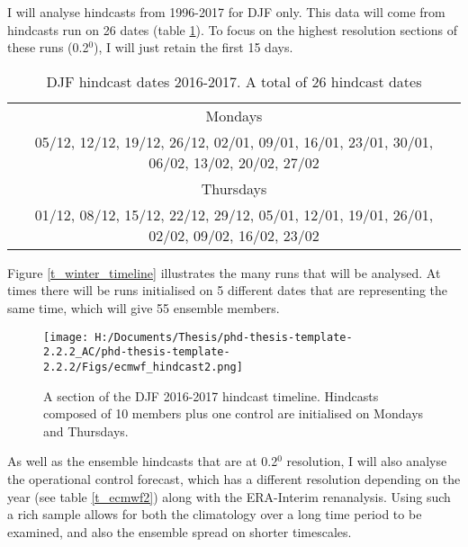 
I will analyse hindcasts from 1996-2017 for DJF only. This data will come from hindcasts run on 26 dates (table \ref{t_winterdates}). To focus on the highest resolution sections of these runs (0.2$^0$), I will just retain the first 15 days.

\begin{table}[h]
	\caption{DJF hindcast dates 2016-2017. A total of 26 hindcast dates}\label{t_winterdates}
	\begin{center}
		\begin{tabular}{c}
			\hline\hline
			Mondays \\
			05/12, 12/12, 19/12, 26/12, 02/01, 09/01, 16/01, 23/01, 30/01, 06/02, 13/02, 20/02, 27/02 \\ 
			\hline
			Thursdays \\			
			01/12, 08/12, 15/12, 22/12, 29/12, 05/01, 12/01, 19/01, 26/01, 02/02, 09/02, 16/02, 23/02  \\ 			
			\hline
		\end{tabular}
	\end{center}
\end{table}

Figure \ref{t_winter_timeline} illustrates the many runs that will be analysed. At times there will be runs initialised on 5 different dates that are representing the same time, which will give 55 ensemble members.

\begin{figure}\label{t_winter_timeline}	
	\texttt{[image: H:/Documents/Thesis/phd-thesis-template-2.2.2\_AC/phd-thesis-template-2.2.2/Figs/ecmwf\_hindcast2.png]}
	\caption{A section of the DJF 2016-2017 hindcast timeline. Hindcasts composed of 10 members plus one control are initialised on Mondays and Thursdays.}\label{fig:ecmwf_hindcast2}
	\centering
\end{figure}

As well as the ensemble hindcasts that are at 0.2$^0$ resolution, I will also analyse the operational control forecast, which has a different resolution depending on the year (see table \ref{t_ecmwf2}) along with the ERA-Interim renanalysis.
Using such a rich sample allows for both the climatology over a long time period to be examined, and also 
the ensemble spread on shorter timescales.


